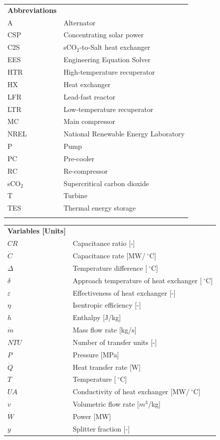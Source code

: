 \documentclass[sustainability,article,accept,moreauthors,pdftex]{Definitions/mdpi}
\begin{document}
\begin{paracol}{2}
{\noindent 
\begin{tabular}{@{}ll}
\textbf{Abbreviations}\\
A & Alternator\\
CSP & Concentrating solar power\\
C2S & sCO$_2$-to-Salt heat exchanger\\
EES & Engineering Equation Solver\\
HTR & High-temperature recuperator\\
HX & Heat exchanger\\
LFR & Lead-fast reactor\\
LTR & Low-temperature recuperator\\
MC & Main compressor\\
NREL & National Renewable Energy Laboratory\\
P & Pump\\
PC & Pre-cooler\\
RC & Re-compressor\\
sCO$_2$ & Supercritical carbon dioxide\\
T & Turbine\\
TES & Thermal energy storage\\

 \\
\end{tabular}


\noindent 
\begin{tabular}{@{}ll}
\textbf{Variables [Units]}\\
$CR$ & Capacitance ratio [-]\\
$\dot{C}$ & Capacitance rate [MW/$~^{\circ}$C]\\
$\Delta$ & Temperature difference [$~^{\circ}$C]\\
$\delta$ & Approach temperature of heat exchanger [$~^{\circ}$C]\\
$\varepsilon$ & Effectiveness of heat exchanger [-]\\
$\eta$ & Isentropic efficiency [-]\\
$h$ & Enthalpy [J/kg]\\
$\dot{m}$ & Mass flow rate [kg/s]\\
$NTU$ & Number of transfer units [-]\\
$P$ & Pressure [MPa]\\
$\dot{Q}$ & Heat transfer rate [W]\\
$T$ & Temperature [$~^{\circ}$C]\\
$UA$ & Conductivity of heat exchanger [MW/$~^{\circ}$C]\\
$v$ & Volumetric flow rate [$m^3$/kg]\\
$\dot{W}$ & Power [MW]\\
$y$ & Splitter fraction [-]\\
\end{tabular}%
}



\end{paracol}
\end{document}
